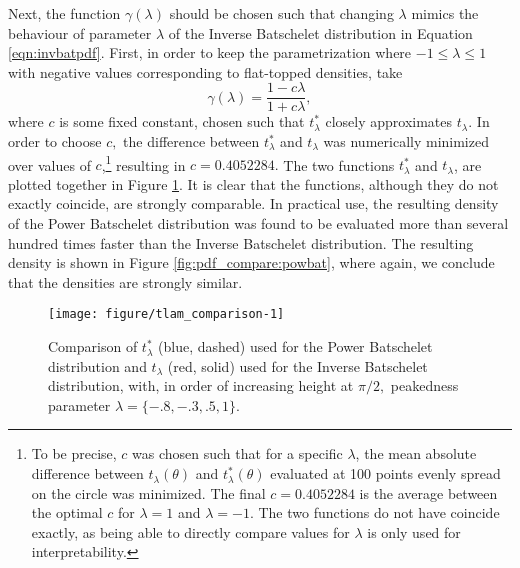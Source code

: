 Next, the function \(\gamma(\lambda)\) should be chosen such that changing \(\lambda\) mimics the behaviour of parameter \(\lambda\) of the Inverse Batschelet distribution in Equation \ref{eqn:invbatpdf}. First, in order to keep the parametrization where \(-1 \leq \lambda \leq 1\) with negative values corresponding to flat-topped densities, take
\begin{equation}
  \gamma(\lambda) = \frac{1 - c\lambda}{1 + c\lambda},
\end{equation}
where \(c\) is some fixed constant, chosen such that \(t_\lambda^\ast\) closely approximates \(t_\lambda.\) In order to choose \(c,\) the difference between \(t_\lambda^\ast\) and \(t_\lambda\) was numerically minimized over values of \(c\),\footnote{To be precise, \(c\) was chosen such that for a specific \(\lambda\), the mean absolute difference between \(t_{\lambda}(\theta)\) and \(t_{\lambda}^\ast(\theta)\) evaluated at 100 points evenly spread on the circle was minimized. The final \(c =  0.4052284\) is the average between the optimal \(c\) for \(\lambda = 1\) and \(\lambda = -1\). The two functions do not have coincide exactly, as being able to directly compare values for \(\lambda\) is only used for interpretability. } resulting in \(c = 0.4052284.\) The two functions \(t_\lambda^\ast\) and \(t_\lambda\), are plotted together in Figure \ref{fig:tlamcompare}. It is clear that the functions, although they do not exactly coincide, are strongly comparable. In practical use, the resulting density of the Power Batschelet distribution was found to be evaluated more than several hundred times faster than the Inverse Batschelet distribution. The resulting density is shown in Figure \ref{fig:pdf_compare:powbat}, where again, we conclude that the densities are strongly similar.




\begin{figure}
\begin{center}
\begin{knitrout}
\color{fgcolor}
\texttt{[image: figure/tlam\_comparison-1]} 

\end{knitrout}
\end{center}
\caption{Comparison of  \(t_\lambda^\ast\) (blue, dashed) used for the Power Batschelet distribution and \(t_\lambda\) (red, solid) used for the Inverse Batschelet distribution, with, in order of increasing height at \(\pi/2,\) peakedness parameter \(\lambda = \{-.8, -.3, .5, 1\}.\)}
\label{fig:tlamcompare}
\end{figure}

